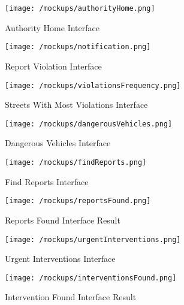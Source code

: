 	\begin{figure}[h]
		\centering
		\begin{minipage}{0.45\textwidth}
			\centering
			\texttt{[image: /mockups/authorityHome.png]}
			\caption{Authority Home Interface}
		\end{minipage}\hfill
		\begin{minipage}{0.45\textwidth}
			\centering
			\texttt{[image: /mockups/notification.png]}
			\caption{Report Violation Interface}
		\end{minipage}
	\end{figure}

	\begin{figure}[h]
		\centering
		\begin{minipage}{0.45\textwidth}
			\centering
			\texttt{[image: /mockups/violationsFrequency.png]}
			\caption{Streets With Most Violations Interface}
		\end{minipage}\hfill
		\begin{minipage}{0.45\textwidth}
			\centering
			\texttt{[image: /mockups/dangerousVehicles.png]}
			\caption{Dangerous Vehicles Interface}
		\end{minipage}
	\end{figure}

	\begin{figure}[h]
		\centering
		\begin{minipage}{0.45\textwidth}
			\centering
			\texttt{[image: /mockups/findReports.png]}
			\caption{Find Reports Interface}
		\end{minipage}\hfill
		\begin{minipage}{0.45\textwidth}
			\centering
			\texttt{[image: /mockups/reportsFound.png]}
			\caption{Reports Found Interface Result}
		\end{minipage}
	\end{figure}

	\begin{figure}[h]
		\centering
		\begin{minipage}{0.45\textwidth}
			\centering
			\texttt{[image: /mockups/urgentInterventions.png]}
			\caption{Urgent Interventions Interface}
		\end{minipage}\hfill
		\begin{minipage}{0.45\textwidth}
			\centering
			\texttt{[image: /mockups/interventionsFound.png]}
			\caption{Intervention Found Interface Result}
		\end{minipage}
	\end{figure}
	 
